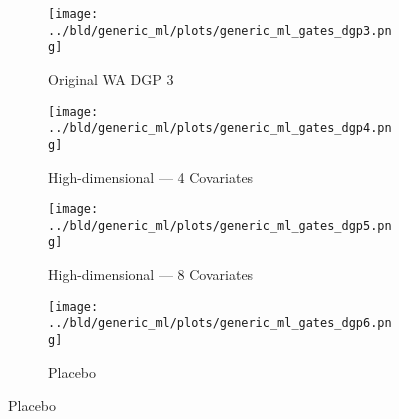\documentclass[11pt, a4paper, leqno]{article}
\begin{document}
\begin{figure}
    \caption{Simulation Results: Generic ML --- GATES}\label{fig:gates}

    \centering
     \begin{subfigure}[b]{0.475\textwidth}
         \centering
         \texttt{[image: ../bld/generic\_ml/plots/generic\_ml\_gates\_dgp3.png]}
         \caption{Original WA DGP 3}\label{fig_gates:dgp3}
     \end{subfigure}
     \hfill
     \begin{subfigure}[b]{0.475\textwidth}
         \centering
         \texttt{[image: ../bld/generic\_ml/plots/generic\_ml\_gates\_dgp4.png]}
         \caption{High-dimensional --- 4 Covariates}\label{fig_gates:dgp4}
     \end{subfigure}

     \begin{subfigure}[b]{0.475\textwidth}
         \centering
         \texttt{[image: ../bld/generic\_ml/plots/generic\_ml\_gates\_dgp5.png]}
         \caption{High-dimensional --- 8 Covariates}\label{fig_gates:dgp5}
     \end{subfigure}
     \begin{subfigure}[b]{0.475\textwidth}
         \centering
         \texttt{[image: ../bld/generic\_ml/plots/generic\_ml\_gates\_dgp6.png]}
         \caption{Placebo}\label{fig_gates:dgp6}
     \end{subfigure}


\end{figure}
\end{document}

